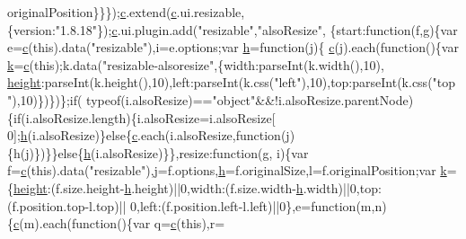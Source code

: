\begin{DoxyCode}
      originalPosition\}\}\});\hyperlink{jquery_8js_ad171626e81625b5e9f5cb177a3a8fb1c}{c}.extend(\hyperlink{jquery_8js_ad171626e81625b5e9f5cb177a3a8fb1c}{c}.ui.resizable,\{version:\textcolor{stringliteral}{"1.8.18"}\});\hyperlink{jquery_8js_ad171626e81625b5e9f5cb177a3a8fb1c}{c}.ui.plugin.add(\textcolor{stringliteral}{"resizable"},\textcolor{stringliteral}{"alsoResize"},
      \{start:\textcolor{keyword}{function}(f,g)\{var e=\hyperlink{jquery_8js_ad171626e81625b5e9f5cb177a3a8fb1c}{c}(\textcolor{keyword}{this}).data(\textcolor{stringliteral}{"resizable"}),i=e.options;var \hyperlink{all__1a_8js_aebecdaf2444e2be39f4804412d6a3bf8}{h}=\textcolor{keyword}{function}(j)\{
      \hyperlink{jquery_8js_ad171626e81625b5e9f5cb177a3a8fb1c}{c}(j).each(\textcolor{keyword}{function}()\{var \hyperlink{jquery_8js_ab26645c014aa005ecedef329ecf58c99}{k}=\hyperlink{jquery_8js_ad171626e81625b5e9f5cb177a3a8fb1c}{c}(\textcolor{keyword}{this});k.data(\textcolor{stringliteral}{"resizable-alsoresize"},\{width:parseInt(k.width(),10),
      \hyperlink{styr_2styr_2main_8c_a48083b65ac9a863566dc3e3fff09a5b4}{height}:parseInt(k.height(),10),left:parseInt(k.css(\textcolor{stringliteral}{"left"}),10),top:parseInt(k.css(\textcolor{stringliteral}{"top"}),10)\})\})\};\textcolor{keywordflow}{if}(
      typeof(i.alsoResize)==\textcolor{stringliteral}{"object"}&&!i.alsoResize.parentNode)\{\textcolor{keywordflow}{if}(i.alsoResize.length)\{i.alsoResize=i.alsoResize[
      0];\hyperlink{all__1a_8js_aebecdaf2444e2be39f4804412d6a3bf8}{h}(i.alsoResize)\}\textcolor{keywordflow}{else}\{\hyperlink{jquery_8js_ad171626e81625b5e9f5cb177a3a8fb1c}{c}.each(i.alsoResize,\textcolor{keyword}{function}(j)\{h(j)\})\}\}\textcolor{keywordflow}{else}\{\hyperlink{all__1a_8js_aebecdaf2444e2be39f4804412d6a3bf8}{h}(i.alsoResize)\}\},resize:\textcolor{keyword}{function}(g,
      i)\{var f=\hyperlink{jquery_8js_ad171626e81625b5e9f5cb177a3a8fb1c}{c}(\textcolor{keyword}{this}).data(\textcolor{stringliteral}{"resizable"}),j=f.options,\hyperlink{all__1a_8js_aebecdaf2444e2be39f4804412d6a3bf8}{h}=f.originalSize,l=f.originalPosition;var 
      \hyperlink{jquery_8js_ab26645c014aa005ecedef329ecf58c99}{k}=\{\hyperlink{styr_2styr_2main_8c_a48083b65ac9a863566dc3e3fff09a5b4}{height}:(f.size.height-\hyperlink{all__1a_8js_aebecdaf2444e2be39f4804412d6a3bf8}{h}.height)||0,width:(f.size.width-\hyperlink{all__1a_8js_aebecdaf2444e2be39f4804412d6a3bf8}{h}.width)||0,top:(f.position.top-l.top)||
      0,left:(f.position.left-l.left)||0\},e=\textcolor{keyword}{function}(m,n)\{\hyperlink{jquery_8js_ad171626e81625b5e9f5cb177a3a8fb1c}{c}(m).each(\textcolor{keyword}{function}()\{var q=\hyperlink{jquery_8js_ad171626e81625b5e9f5cb177a3a8fb1c}{c}(\textcolor{keyword}{this}),r=

\end{DoxyCode}

